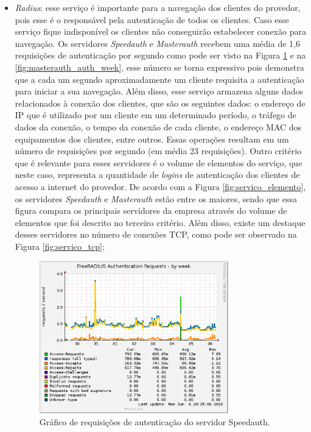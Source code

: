 \begin{itemize}
 \item \textit{Radius}: esse serviço é importante para a navegação dos clientes do provedor, pois esse é o responsável pela autenticação de 
 todos os clientes. Caso esse serviço fique indisponível os clientes não conseguirão estabelecer conexão para navegação. Os servidores
 \textit{Speedauth} e \textit{Masterauth} recebem uma média de 1,6 requisições de autenticação por segundo como pode ser visto na Figura 
 \ref{fig:speedauth_auth_week} e na \ref{fig:masterauth_auth_week}, esse número se torna expressivo pois demonstra que a cada um segundo 
 aproximadamente um cliente requisita a autenticação para iniciar a sua navegação. Além disso, esse serviço armazena alguns dados relacionados 
 à conexão dos clientes, que são os seguintes dados: o endereço de \ac{IP} que é utilizado por um cliente em um determinado período, o tráfego 
 de dados da conexão, o tempo da conexão de cada cliente, o endereço \ac{MAC} dos equipamentos dos clientes, entre outros. Essas operações 
 resultam em um número de requisições por segundo (em média 23 requisições).
 Outro critério que é relevante para esses servidores é o volume de elementos do serviço, que neste caso, representa a quantidade de \textit{logins} 
 de autenticação dos clientes de acesso a internet do provedor. De acordo com a Figura \ref{fig:servico_elemento}, os servidores \textit{Speedauth} 
 e \textit{Masterauth} estão entre os maiores, sendo que essa figura compara os principais servidores da empresa através do volume de elementos
 que foi descrito no terceiro critério. Além disso, existe um destaque desses servidores no número de conexões \ac{TCP}, como pode ser observado 
 na Figura \ref{fig:servico_tcp};
 
\begin{figure}[h!]
 \centering
 \includegraphics[width=310px]{img/speedauth_auth_week.eps}
 \caption{Gráfico de requisições de autenticação do servidor Speedauth.}
 \label{fig:speedauth_auth_week}
\end{figure}


\end{itemize}
